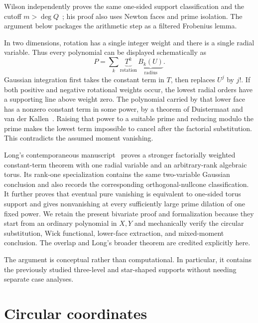 \documentclass[11pt]{article}
\begin{document}
Wilson independently proves the same one-sided support classification and
the cutoff \(m>\deg Q\)~\cite{Wilson}; his proof also uses Newton faces
and prime isolation.  The argument below packages the arithmetic step as
a filtered Frobenius lemma.

In two
dimensions, rotation has a single integer weight and there is a single
radial variable.  Thus every polynomial can be displayed schematically as
\[
  P=\sum_k \underbrace{T^k}_{\text{rotation}}\,
                  \underbrace{B_k(U)}_{\text{radius}}.
\]
Gaussian integration first takes the constant term in \(T\), then replaces
\(U^j\) by \(j!\).  If both positive and negative rotational weights occur,
the lowest radial orders have a supporting line above weight zero.  The
polynomial carried by that lower face has a nonzero constant term in some
power, by a theorem of Duistermaat and van der Kallen~\cite{DK}.  Raising
that power to a suitable prime and reducing modulo the prime makes the
lowest term impossible to cancel after the factorial substitution.  This
contradicts the assumed moment vanishing.

Long's contemporaneous manuscript~\cite{LongTorus} proves a stronger
factorially weighted constant-term theorem with one radial variable and an
arbitrary-rank algebraic torus.  Its rank-one specialization contains the
same two-variable Gaussian conclusion and also records the corresponding
orthogonal-nullcone classification.  It further proves that eventual pure
vanishing is equivalent to one-sided torus support and gives nonvanishing at
every sufficiently large prime dilation of one fixed power.  We retain the
present bivariate proof and formalization because they start from an ordinary
polynomial in \(X,Y\) and mechanically verify the circular substitution,
Wick functional, lower-face extraction, and mixed-moment conclusion.  The
overlap and Long's broader theorem are credited explicitly here.

The argument is conceptual rather than computational.  In particular, it
contains the previously studied three-level and star-shaped supports
without needing separate case analyses.

\section{Circular coordinates}
\end{document}
